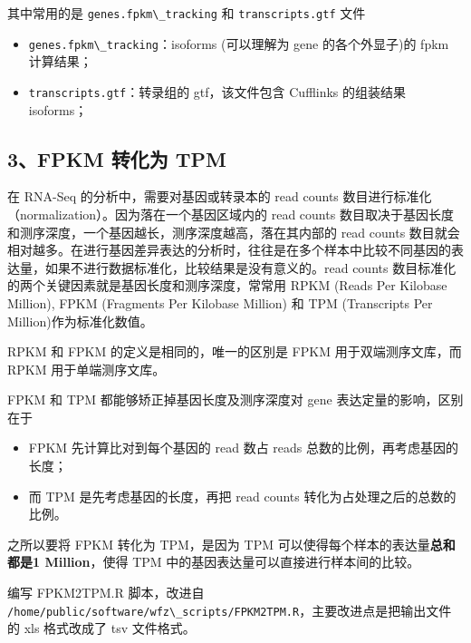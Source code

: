 \documentclass[
  a4paper,
]{article}
\newcommand{\passthrough}[1]{#1}
\providecommand{\tightlist}{%
  \setlength{\itemsep}{0pt}\setlength{\parskip}{0pt}}\usepackage{longtable,booktabs,array}
\begin{document}
\begin{enumerate}
\begin{enumerate}
    其中常用的是 \passthrough{\lstinline!genes.fpkm\_tracking!} 和
    \passthrough{\lstinline!transcripts.gtf!} 文件

    \begin{itemize}
    \tightlist
    \item
      \passthrough{\lstinline!genes.fpkm\_tracking!}：isoforms
      (可以理解为 gene 的各个外显子)的 fpkm 计算结果；
    \item
      \passthrough{\lstinline!transcripts.gtf!}：转录组的
      gtf，该文件包含 Cufflinks 的组装结果 isoforms；
    \end{itemize}
  \end{enumerate}
\end{enumerate}

\hypertarget{fpkm-ux8f6cux5316ux4e3a-tpm}{%
\subsection{3、FPKM 转化为 TPM}\label{fpkm-ux8f6cux5316ux4e3a-tpm}}

在 RNA-Seq 的分析中，需要对基因或转录本的 read counts
数目进行标准化（normalization）。因为落在一个基因区域内的 read counts
数目取决于基因长度和测序深度，一个基因越长，测序深度越高，落在其内部的
read counts
数目就会相对越多。在进行基因差异表达的分析时，往往是在多个样本中比较不同基因的表达量，如果不进行数据标准化，比较结果是没有意义的。read
counts 数目标准化的两个关键因素就是基因长度和测序深度，常常用 RPKM
(Reads Per Kilobase Million), FPKM (Fragments Per Kilobase Million) 和
TPM (Transcripts Per Million)作为标准化数值。

RPKM 和 FPKM 的定义是相同的，唯一的区別是 FPKM 用于双端测序文库，而 RPKM
用于单端测序文库。

FPKM 和 TPM 都能够矫正掉基因长度及测序深度对 gene
表达定量的影响，区别在于

\begin{itemize}
\tightlist
\item
  FPKM 先计算比对到每个基因的 read 数占 reads
  总数的比例，再考虑基因的长度；
\item
  而 TPM 是先考虑基因的长度，再把 read counts
  转化为占处理之后的总数的比例。
\end{itemize}

之所以要将 FPKM 转化为 TPM，是因为 TPM
可以使得每个样本的表达量\textbf{总和都是1 Million}，使得 TPM
中的基因表达量可以直接进行样本间的比较。

编写 FPKM2TPM.R 脚本，改进自
\passthrough{\lstinline!/home/public/software/wfz\_scripts/FPKM2TPM.R!}\hspace{0pt}，主要改进点是把输出文件的
xls 格式改成了 tsv 文件格式。
\end{document}
